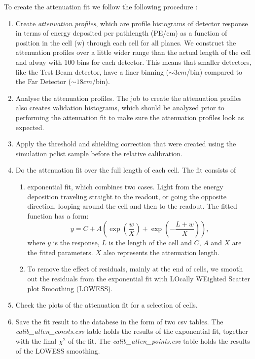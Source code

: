 \documentclass[12pt,a4paper]{article}
\begin{document}
To create the attenuation fit we follow the following procedure \cite{NOVA-doc-7410}:
\begin{enumerate}
\item Create \textit{attenuation profiles}, which are profile histograms of detector response in terms of energy deposited per pathlength (PE/cm) as a function of position in the cell (w) through each cell for all planes. We construct the attenuation profiles over a little wider range than the actual length of the cell and alway with 100 bins for each detector. This means that smaller detectors, like the Test Beam detector, have a finer binning ($\sim 3\unit{cm}$/bin) compared to the Far Detector ($\sim 18\unit{cm}$/bin).
\item Analyse the attenuation profiles. The job to create the attenuation profiles also creates validation histograms, which should be analyzed prior to performing the attenuation fit to make sure the attenuation profiles look as expected.
\item Apply the threshold and shielding correction that were created using the simulation pclist sample before the relative calibration.
\item Do the attenuation fit over the full length of each cell. The fit consists of
\begin{enumerate}
\item exponential fit, which combines two cases. Light from the energy deposition traveling straight to the readout, or going the opposite direction, looping around the cell and then to the readout. The fitted function has a form:\\
\begin{equation}
y=C+A\left(\exp\left(\frac{w}{X}\right)+\exp\left(-\frac{L+w}{X}\right)\right),
\end{equation}
where $y$ is the response, $L$ is the length of the cell and $C$, $A$ and $X$ are the fitted parameters. $X$ also represents the attenuation length.
\item To remove the effect of residuals, mainly at the end of cells, we smooth out the residuals from the exponential fit with LOcally WEighted Scatter plot Smoothing (LOWESS).
\end{enumerate}
\item Check the plots of the attenuation fit for a selection of cells.
\item Save the fit result to the databese in the form of two csv tables. The \textit{calib\_atten\_consts.csv} table holds the results of the exponential fit, together with the final $\chi^2$ of the fit. The \textit{calib\_atten\_points.csv} table holds the results of the LOWESS smoothing.
\end{enumerate}
\end{document}
